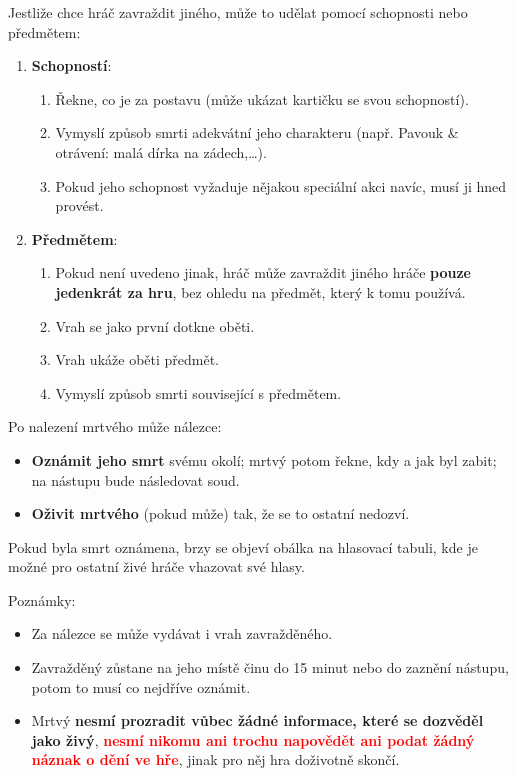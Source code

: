 \documentclass[11pt]{article} %
\begin{document}
Jestliže chce hráč zavraždit jiného, může to udělat pomocí schopnosti nebo předmětem:
\begin{enumerate}
\item \textbf{Schopností}:
	\begin{enumerate} 
		\item Řekne, co je za postavu (může ukázat kartičku se svou schopností).
        \item Vymyslí způsob smrti adekvátní jeho charakteru (např. Pavouk \& otrávení: malá dírka na zádech,\dots).
        \item Pokud jeho schopnost vyžaduje nějakou speciální akci navíc, musí ji hned provést.
	\end{enumerate}
\item \textbf{Předmětem}:
	\begin{enumerate}
        \item Pokud není uvedeno jinak, hráč může zavraždit jiného hráče \textbf{pouze jedenkrát za hru}, bez ohledu na předmět, který k tomu používá.
        \item Vrah se jako první dotkne oběti.
		\item Vrah ukáže oběti předmět.
		\item Vymyslí způsob smrti související s předmětem.
	\end{enumerate}
\end{enumerate}

Po nalezení mrtvého může nálezce:
\begin{itemize}
	\item \textbf{Oznámit jeho smrt} svému okolí; mrtvý potom řekne, kdy a jak byl zabit; na nástupu bude následovat soud.
	\item \textbf{Oživit mrtvého} (pokud může) tak, že se to ostatní nedozví.
\end{itemize}

Pokud byla smrt oznámena, brzy se objeví obálka na hlasovací tabuli, kde je možné pro ostatní živé hráče vhazovat své hlasy.

Poznámky:
\begin{itemize}
	\item Za nálezce se může vydávat i vrah zavražděného.
	\item Zavražděný zůstane na jeho místě činu do 15 minut nebo do zaznění nástupu, potom to musí co nejdříve oznámit.
	\item Mrtvý \textbf{nesmí prozradit vůbec žádné informace, které se dozvěděl jako živý}, \textbf{\textcolor{red}{nesmí nikomu ani trochu napovědět ani podat žádný náznak o dění ve hře}}, jinak pro něj hra doživotně skončí.
\end{itemize}
\end{document}
